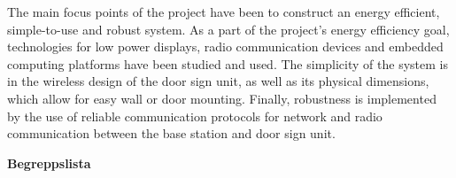 \documentclass[a4paper,11pt]{article}
\begin{document}
The main focus points of the project have been to construct an energy efficient, simple-to-use and robust system. As a part of the project’s energy efficiency goal, technologies for low power displays, radio communication devices and embedded computing platforms have been studied and used. The simplicity of the system is in the wireless design of the door sign unit, as well as its physical dimensions, which allow for easy wall or door mounting. Finally, robustness is implemented by the use of reliable communication protocols for network and radio communication between the base station and door sign unit. 

\thispagestyle{empty}
\pagebreak

\thispagestyle{empty}
\begin{center}
{\noindent \bf Begreppslista}\\
\end{center}
\end{document}
